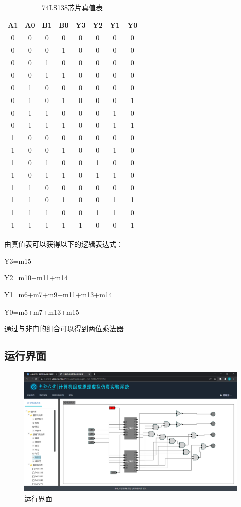 \documentclass[UTF8,12pt]{article}
\begin{document}
\begin{table}[htbp]
    \centering
    \caption{74LS138芯片真值表}
    \begin{tabular}{|c|c|c|c|c|c|c|c|}
        \hline
        A1 & A0 & B1 & B0 & Y3 & Y2 & Y1 & Y0 \\
        \hline
        0&0&0&0&0&0&0&0 \\
        0&0&0&1&0&0&0&0 \\
        0&0&1&0&0&0&0&0 \\
        0&0&1&1&0&0&0&0 \\
        0&1&0&0&0&0&0&0 \\
        0&1&0&1&0&0&0&1 \\
        0&1&1&0&0&0&1&0 \\
        0&1&1&1&0&0&1&1 \\
        1&0&0&0&0&0&0&0 \\
        1&0&0&1&0&0&1&0 \\
        1&0&1&0&0&1&0&0 \\
        1&0&1&1&0&1&1&0 \\
        1&1&0&0&0&0&0&0 \\
        1&1&0&1&0&0&1&1 \\
        1&1&1&0&0&1&1&0 \\
        1&1&1&1&1&0&0&1 \\
        \hline
    \end{tabular}
\end{table}

由真值表可以获得以下的逻辑表达式：

Y3=m15

Y2=m10+m11+m14

Y1=m6+m7+m9+m11+m13+m14

Y0=m5+m7+m13+m15

通过与非门的组合可以得到两位乘法器

\subsection{运行界面}
\begin{figure}[htbp]
    \centering
    \includegraphics[width=1.0\textwidth]{img/20.png}
    \caption{运行界面}
\end{figure}
\end{document}
